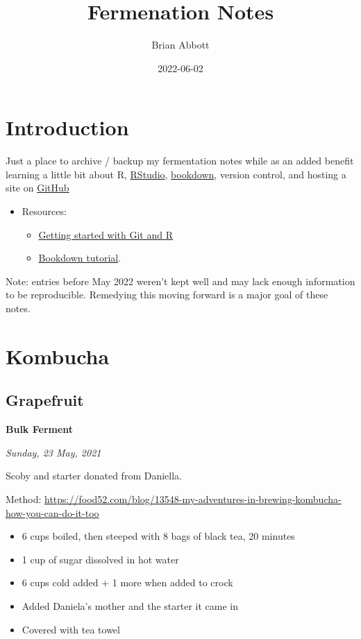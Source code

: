 \documentclass[
]{book}
\title{Fermenation Notes}
\author{Brian Abbott}
\date{2022-06-02}
\providecommand{\tightlist}{%
  \setlength{\itemsep}{0pt}\setlength{\parskip}{0pt}}
\begin{document}
\maketitle

{
\setcounter{tocdepth}{1}
\tableofcontents
}
\hypertarget{introduction}{%
\chapter{Introduction}\label{introduction}}

Just a place to archive / backup my fermentation notes while as an added benefit learning a little bit about R, \href{https://www.rstudio.com/}{RStudio}, \href{https://bookdown.org/}{bookdown}, version control, and hosting a site on \href{https://github.com/}{GitHub}

\begin{itemize}
\tightlist
\item
  Resources:

  \begin{itemize}
  \tightlist
  \item
    \href{https://happygitwithr.com/}{Getting started with Git and R}
  \item
    \href{https://bookdown.org/yihui/bookdown/get-started.html}{Bookdown tutorial}.
  \end{itemize}
\end{itemize}

Note: entries before May 2022 weren't kept well and may lack enough information to be reproducible. Remedying this moving forward is a major goal of these notes.

\hypertarget{kombucha}{%
\chapter{Kombucha}\label{kombucha}}

\hypertarget{grapefruit}{%
\section{Grapefruit}\label{grapefruit}}

\textbf{Bulk Ferment}

\emph{Sunday, 23 May, 2021}

Scoby and starter donated from Daniella.

Method: \url{https://food52.com/blog/13548-my-adventures-in-brewing-kombucha-how-you-can-do-it-too}

\begin{itemize}
\item
  6 cups boiled, then steeped with 8 bags of black tea, 20 minutes
\item
  1 cup of sugar dissolved in hot water
\item
  6 cups cold added + 1 more when added to crock
\item
  Added Daniela's mother and the starter it came in
\item
  Covered with tea towel
\end{itemize}
\end{document}
